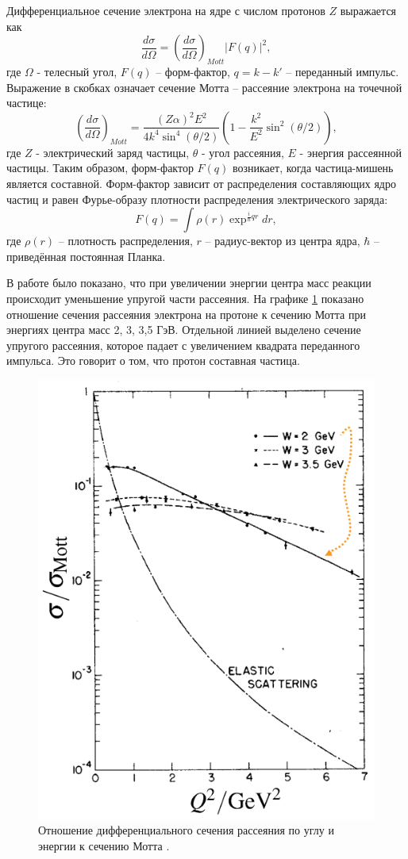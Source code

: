\documentclass{extarticle}
\begin{document}
Дифференциальное сечение электрона на ядре с числом протонов $Z$ выражается как 
\begin{equation}
    \frac{d\sigma}{d\Omega} = ( \frac{d\sigma}{d\Omega})_{Mott} |F(q)|^2 ,
\end{equation}
где $\Omega$ - телесный угол, $F(q)$ -- форм-фактор, $q = k-k'$ -- переданный импульс. Выражение в скобках означает сечение Мотта -- рассеяние электрона на точечной частице:
\begin{equation}
    (\frac{d\sigma}{d\Omega})_{Mott} = \frac{(Z\alpha)^2 E^2}{4k^4 \sin^4 (\theta/2)} (1- \frac{k^2}{E^2} \sin^2(\theta/2)),
\end{equation}
где $Z$ - электрический заряд частицы, $\theta$ - угол рассеяния, $E$ - энергия рассеянной частицы. Таким образом, форм-фактор $F(q)$ возникает, когда частица-мишень является составной. Форм-фактор зависит от распределения составляющих ядро частиц и равен Фурье-образу плотности распределения электрического заряда:
\begin{equation}
    F(q) = \int \rho(r) \exp^{\frac{i}{\hbar}qr}dr,
\end{equation}
где $\rho(r)$ -- плотность распределения, $r$ -- радиус-вектор из центра ядра, $\hbar$ -- приведённая постоянная Планка.

В работе \cite{Breidenbach} было показано, что при увеличении энергии центра масс реакции происходит уменьшение упругой части рассеяния. На графике \ref{fig:Mott} показано отношение сечения рассеяния электрона на протоне к сечению Мотта при энергиях центра масс 2, 3, 3,5 ГэВ. Отдельной линией выделено сечение упругого рассеяния, которое падает с увеличением квадрата переданного импульса. Это говорит о том, что протон составная частица. 
\begin{figure}[ht]
    \centering
    \includegraphics[width = 0.6\linewidth]{Mott.png}
    \caption{Отношение дифференциального сечения рассеяния по углу и энергии к сечению Мотта \cite{Breidenbach}.}
    \label{fig:Mott}
\end{figure}
\end{document}
